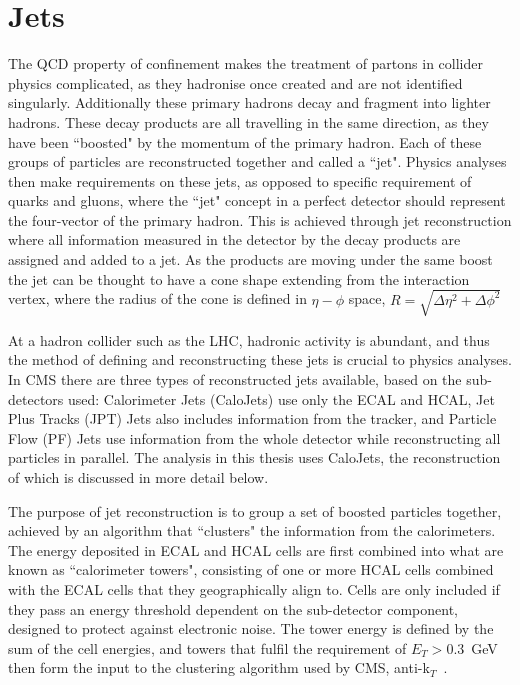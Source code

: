 \section{Jets}
\label{sec:reconjet}
 The QCD property of confinement makes the treatment of partons in collider physics complicated, as they hadronise once created and are not identified singularly. Additionally these primary hadrons decay and fragment into lighter hadrons. These decay products are all travelling in the same direction, as they have been ``boosted" by the momentum of the primary hadron. Each of these groups of particles are reconstructed together and called a ``jet". Physics analyses then make requirements on these jets, as opposed to specific requirement of quarks and gluons, where the ``jet" concept in a perfect detector should represent the four-vector of the primary hadron. This is achieved through jet reconstruction where all information measured in the detector by the decay products are assigned and added to a jet. As the products are moving under the same boost the jet can be thought to have a cone shape extending from the interaction vertex, where the radius of the cone is defined in $\eta-\phi$ space, $R= \sqrt{\Delta \eta^{2} + \Delta \phi^{2}}$
 
 At a hadron collider such as the LHC, hadronic activity is abundant, and thus the method of defining and reconstructing these jets is crucial to physics analyses. In CMS there are three types of reconstructed jets available, based on the sub-detectors used: Calorimeter Jets (CaloJets) use only the ECAL and HCAL, Jet Plus Tracks (JPT) Jets also includes information from the tracker, and Particle Flow (PF) Jets use information from the whole detector while reconstructing all particles in parallel. The analysis in this thesis uses CaloJets, the reconstruction of which is discussed in more detail below. 
 
 The purpose of jet reconstruction is to group a set of boosted particles together, achieved by an algorithm that ``clusters" the information from the calorimeters. The energy deposited in ECAL and HCAL cells are first combined into what are known as ``calorimeter towers", consisting of one or more HCAL cells combined with the ECAL cells that they geographically align to. Cells are only included if they pass an energy threshold dependent on the sub-detector component, designed to protect against electronic noise. The tower energy is defined by the sum of the cell energies, and towers that fulfil the requirement of $E_{T} > 0.3$~GeV then form the input to the clustering algorithm used by CMS, anti-k$_{T}$~\cite{jetroundup}.

